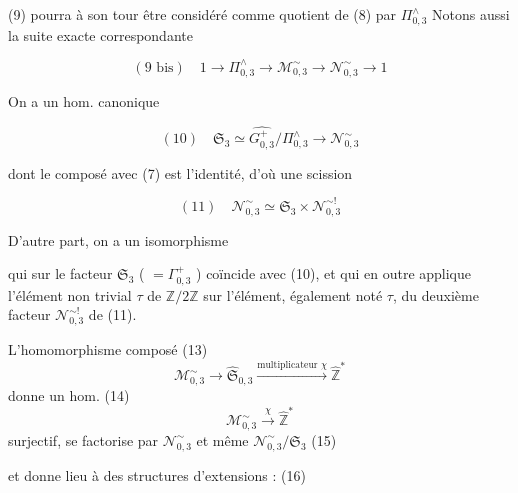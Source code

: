 \begin{enumerate}
(9) pourra à son tour être considéré comme quotient de (8) par $\Pi_{0,3}^\wedge$ \quad Notons aussi la suite exacte correspondante

$$(9 \text{ bis}) \quad 1 \longrightarrow \Pi_{0,3}^\wedge \longrightarrow \mathcal{M}_{0,3}^\sim \longrightarrow \mathcal{N}_{0,3}^\sim \longrightarrow 1$$

On a un hom. canonique

$$(10) \quad \mathfrak{S}_3 \simeq \widehat{G_{0,3}^+} / \Pi_{0,3}^\wedge \longrightarrow \mathcal{N}_{0,3}^\sim$$

dont le composé avec (7) est l'identité, d'où une scission

$$(11) \quad \mathcal{N}_{0,3}^\sim \simeq \mathfrak{S}_3 \times \mathcal{N}_{0,3}^{\sim !}$$

D'autre part, on a un isomorphisme


qui sur le facteur $\mathfrak{S}_3$ ( $= \Gamma_{0,3}^+$ ) coïncide avec (10), et qui en outre applique l'élément non trivial $\tau$ de $\mathbb{Z}/2\mathbb{Z}$ sur l'élément, également noté $\tau$, du deuxième facteur $\mathcal{N}_{0,3}^{\sim !}$ de (11).

\newpage


L'homomorphisme composé
(13) $$ \mathcal{M}_{0,3}^\sim \to \hat{\mathfrak{S}}_{0,3} \xrightarrow{\text{multiplicateur } \chi} \hat{\mathbb{Z}}^* $$
donne un hom.
(14) $$ \mathcal{M}_{0,3}^\sim \xrightarrow{\chi} \hat{\mathbb{Z}}^* $$
surjectif, se factorise par $\mathcal{N}_{0,3}^\sim$ et même $\mathcal{N}_{0,3}^\sim / \mathfrak{S}_3$
(15) 

et donne lieu à des structures d'extensions :
(16)


\end{enumerate}

